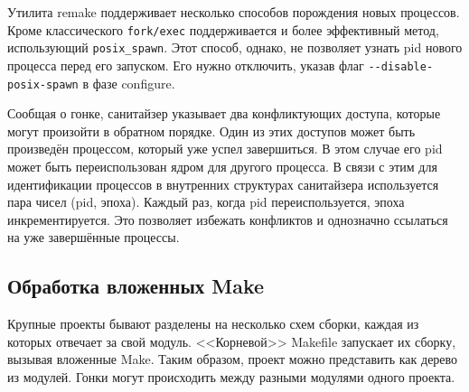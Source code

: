 Утилита remake поддерживает несколько способов порождения новых процессов. Кроме классического \texttt{fork/exec} поддерживается и более эффективный метод, использующий \texttt{posix\_spawn}. Этот способ, однако, не позволяет узнать pid нового процесса перед его запуском. Его нужно отключить, указав флаг \texttt{-{}-disable-posix-spawn} в фазе configure.

Сообщая о гонке, санитайзер указывает два конфликтующих доступа, которые могут произойти в обратном порядке. Один из этих доступов может быть произведён процессом, который уже успел завершиться. В этом случае его pid может быть переиспользован ядром для другого процесса. В связи с этим для идентификации процессов в внутренних структурах санитайзера используется пара чисел (pid, эпоха). Каждый раз, когда pid переиспользуется, эпоха инкрементируется. Это позволяет избежать конфликтов и однозначно ссылаться на уже завершённые процессы.

\subsection{Обработка вложенных Make}
\label{subsec:nested-make}

Крупные проекты бывают разделены на несколько схем сборки, каждая из которых отвечает за свой модуль. <<Корневой>> Makefile запускает их сборку, вызывая вложенные Make. Таким образом, проект можно представить как дерево из модулей. Гонки могут происходить между разными модулями одного проекта.

